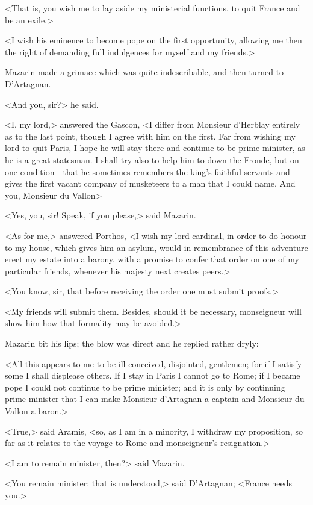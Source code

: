 <That is, you wish me to lay aside my ministerial functions, to quit France and be an exile.>

<I wish his eminence to become pope on the first opportunity, allowing me then the right of demanding full indulgences for myself and my friends.>

Mazarin made a grimace which was quite indescribable, and then turned to D'Artagnan.

<And you, sir?> he said.

<I, my lord,> answered the Gascon, <I differ from Monsieur d'Herblay entirely as to the last point, though I agree with him on the first. Far from wishing my lord to quit Paris, I hope he will stay there and continue to be prime minister, as he is a great statesman. I shall try also to help him to down the Fronde, but on one condition—that he sometimes remembers the king's faithful servants and gives the first vacant company of musketeers to a man that I could name. And you, Monsieur du Vallon\longdash>

<Yes, you, sir! Speak, if you please,> said Mazarin.

<As for me,> answered Porthos, <I wish my lord cardinal, in order to do honour to my house, which gives him an asylum, would in remembrance of this adventure erect my estate into a barony, with a promise to confer that order on one of my particular friends, whenever his majesty next creates peers.>

<You know, sir, that before receiving the order one must submit proofs.>

<My friends will submit them. Besides, should it be necessary, monseigneur will show him how that formality may be avoided.>

Mazarin bit his lips; the blow was direct and he replied rather dryly:

<All this appears to me to be ill conceived, disjointed, gentlemen; for if I satisfy some I shall displease others. If I stay in Paris I cannot go to Rome; if I became pope I could not continue to be prime minister; and it is only by continuing prime minister that I can make Monsieur d'Artagnan a captain and Monsieur du Vallon a baron.>

<True,> said Aramis, <so, as I am in a minority, I withdraw my proposition, so far as it relates to the voyage to Rome and monseigneur's resignation.>

<I am to remain minister, then?> said Mazarin.

<You remain minister; that is understood,> said D'Artagnan; <France needs you.>

